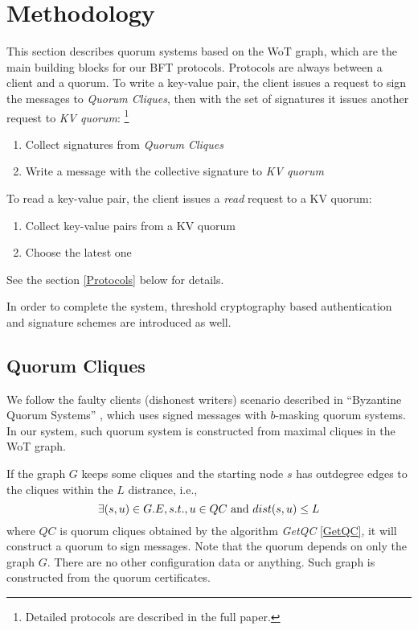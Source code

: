 \section{Methodology}
This section describes quorum systems based on the WoT graph, which
are the main building blocks for our BFT protocols. Protocols are
always between a client and a quorum. To write a key-value pair, the
client issues a request to sign the messages to {\em Quorum Cliques},
then with the set of signatures it issues another request to {\em KV
  quorum}:
\ifdefined\ABSTRACT
\footnote{Detailed protocols are described in the full paper.}
\fi
\begin{enumerate}
\item Collect signatures from {\em Quorum Cliques}
\item Write a message with the collective signature to {\em
    KV quorum}
\end{enumerate}
To read a key-value pair, the client issues a {\em read}
request to a KV quorum:
\begin{enumerate}
\item Collect key-value pairs from a KV quorum
\item Choose the latest one
\end{enumerate}
\ifdefined\ABSTRACT
\else
See the section \ref{Protocols} below for details.
\fi

In order to complete the system, threshold cryptography based
authentication and signature schemes are introduced as well.

\subsection{Quorum Cliques}
We follow the faulty clients (dishonest writers) scenario described in
``Byzantine Quorum Systems'' \cite{Delhi:1,Delhi:2}, which uses signed
messages with $b$-masking quorum systems. In our system, such quorum
system is constructed from maximal cliques in the WoT graph.

If the graph $G$ keeps some cliques and the starting node $s$ has
outdegree edges to the cliques within the $L$ distrance, i.e.,
\[
\exists (s, u) \in G.E, s.t., u \in QC \text{ and } dist(s, u) \le L \\
\]
where $QC$ is quorum cliques obtained by the algorithm {\em GetQC}
\ref{GetQC},
it will construct a quorum to sign messages. Note that the quorum
depends on only the graph $G$. There are no other configuration data
or anything.
Such graph is constructed from the quorum certificates. 

